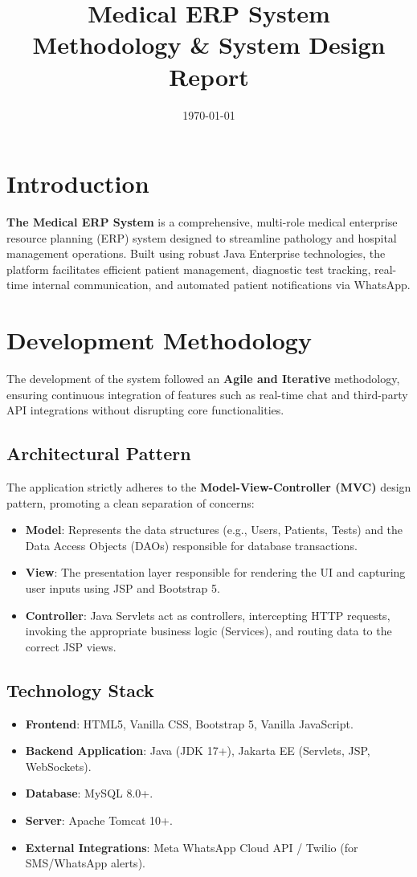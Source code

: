 \documentclass[12pt,a4paper]{article}
\title{\textbf{Medical ERP System} \\ Methodology \& System Design Report}
\author{}
\date{\today}
\begin{document}
\maketitle

\section{Introduction}
\textbf{The Medical ERP System} is a comprehensive, multi-role medical enterprise resource planning (ERP) system designed to streamline pathology and hospital management operations. Built using robust Java Enterprise technologies, the platform facilitates efficient patient management, diagnostic test tracking, real-time internal communication, and automated patient notifications via WhatsApp.

\section{Development Methodology}
The development of the system followed an \textbf{Agile and Iterative} methodology, ensuring continuous integration of features such as real-time chat and third-party API integrations without disrupting core functionalities.

\subsection{Architectural Pattern}
The application strictly adheres to the \textbf{Model-View-Controller (MVC)} design pattern, promoting a clean separation of concerns:
\begin{itemize}[leftmargin=*]
    \item \textbf{Model}: Represents the data structures (e.g., Users, Patients, Tests) and the Data Access Objects (DAOs) responsible for database transactions.
    \item \textbf{View}: The presentation layer responsible for rendering the UI and capturing user inputs using JSP and Bootstrap 5.
    \item \textbf{Controller}: Java Servlets act as controllers, intercepting HTTP requests, invoking the appropriate business logic (Services), and routing data to the correct JSP views.
\end{itemize}

\subsection{Technology Stack}
\begin{itemize}
    \item \textbf{Frontend}: HTML5, Vanilla CSS, Bootstrap 5, Vanilla JavaScript.
    \item \textbf{Backend Application}: Java (JDK 17+), Jakarta EE (Servlets, JSP, WebSockets).
    \item \textbf{Database}: MySQL 8.0+.
    \item \textbf{Server}: Apache Tomcat 10+.
    \item \textbf{External Integrations}: Meta WhatsApp Cloud API / Twilio (for SMS/WhatsApp alerts).
\end{itemize}
\end{document}
